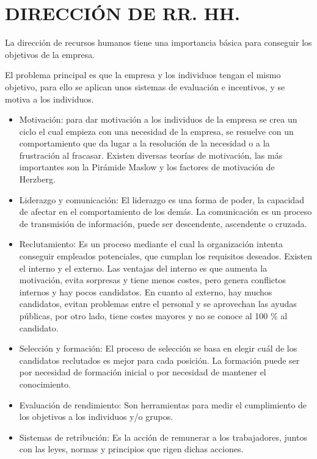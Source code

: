 \documentclass[12pt, twoside, openright]{report} %
\begin{document}
\section{DIRECCIÓN DE RR. HH.}
La dirección de recursos humanos tiene una importancia básica para conseguir los objetivos de la
empresa.

El problema principal es que la empresa y los individuos tengan el mismo objetivo, para ello se
aplican unos sistemas de evaluación e incentivos, y se motiva a los individuos.
\begin{itemize}
	\item Motivación: para dar motivación a los individuos de la empresa se crea un ciclo el cual empieza
	      con una necesidad de la empresa, se resuelve con un comportamiento que da lugar a la
	      resolución de la necesidad o a la frustración al fracasar. Existen diversas teorías de motivación,
	      las más importantes son la Pirámide Maslow y los factores de motivación de Herzberg.
	\item Liderazgo y comunicación: El liderazgo es una forma de poder, la capacidad de afectar en el
	      comportamiento de los demás. La comunicación es un proceso de transmisión de información,
	      puede ser descendente, ascendente o cruzada.
	\item Reclutamiento: Es un proceso mediante el cual la organización intenta conseguir empleados
	      potenciales, que cumplan los requisitos deseados. Existen el interno y el externo. Las ventajas
	      del interno es que aumenta la motivación, evita sorpresas y tiene menos costes, pero genera
	      conflictos internos y hay pocos candidatos. En cuanto al externo, hay muchos candidatos,
	      evitan problemas entre el personal y se aprovechan las ayudas públicas, por otro lado, tiene
	      costes mayores y no se conoce al 100 \% al candidato.
	\item Selección y formación: El proceso de selección se basa en elegir cuál de los candidatos
	      reclutados es mejor para cada posición. La formación puede ser por necesidad de formación
	      inicial o por necesidad de mantener el conocimiento.
	\item Evaluación de rendimiento: Son herramientas para medir el cumplimiento de los objetivos a
	      los individuos y/o grupos.
	\item Sistemas de retribución: Es la acción de remunerar a los trabajadores, juntos con las leyes,
	      normas y principios que rigen dichas acciones.
\end{itemize}
\end{document}
